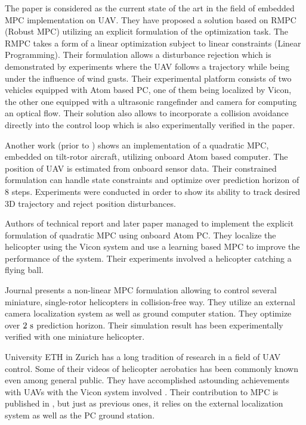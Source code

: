 The paper \citep{alexis2014rmpc} is considered as the current state of the art in the field of embedded MPC implementation on UAV. They have proposed a solution based on RMPC (Robust MPC)  utilizing an explicit formulation of the optimization task. The RMPC takes a form of a linear optimization subject to linear constraints (Linear Programming). Their formulation allows a disturbance rejection which is demonstrated by experiments where the UAV follows a trajectory while being under the influence of wind gusts. Their experimental platform consists of two vehicles equipped with Atom based PC, one of them being localized by Vicon, the other one equipped with a ultrasonic rangefinder and camera for computing an optical flow. Their solution also allows to incorporate a collision avoidance directly into the control loop which is also experimentally verified in the paper.

Another work \citep{papachristos2013} (prior to \citep{alexis2014rmpc}) shows an implementation of a quadratic MPC, embedded on tilt-rotor aircraft, utilizing onboard Atom based computer. The position of UAV is estimated from onboard sensor data. Their constrained formulation can handle state constraints and optimize over prediction horizon of 8 steps. Experiments were conducted in order to show its ability to track desired 3D trajectory and reject position disturbances.

Authors of technical report \citep{bouffard2012dtic} and later paper \citep{bouffard2012learning} managed to implement the explicit formulation of quadratic MPC using onboard Atom PC. They localize the helicopter using the Vicon system and use a learning based MPC to improve the performance of the system. Their experiments involved a helicopter catching a flying ball.

Journal \cite{suzuki2014collision} presents a non-linear MPC formulation allowing to control several miniature, single-rotor helicopters in collision-free way. They utilize an external camera localization system as well as ground computer station. They optimize over $2 ~\mathrm{s}$ prediction horizon. Their simulation result has been experimentally verified with one miniature helicopter.

University ETH in Zurich has a long tradition of research in a field of UAV control. Some of their videos of helicopter aerobatics has been commonly known even among general public. They have accomplished astounding achievements with UAVs with the Vicon system involved \citep{brescianini2013polearobatics, Augugliaro2013buildingstructures}. Their contribution to MPC is published in \citep{ethMueller2013mpc}, but just as previous ones, it relies on the external localization system as well as the PC ground station.

